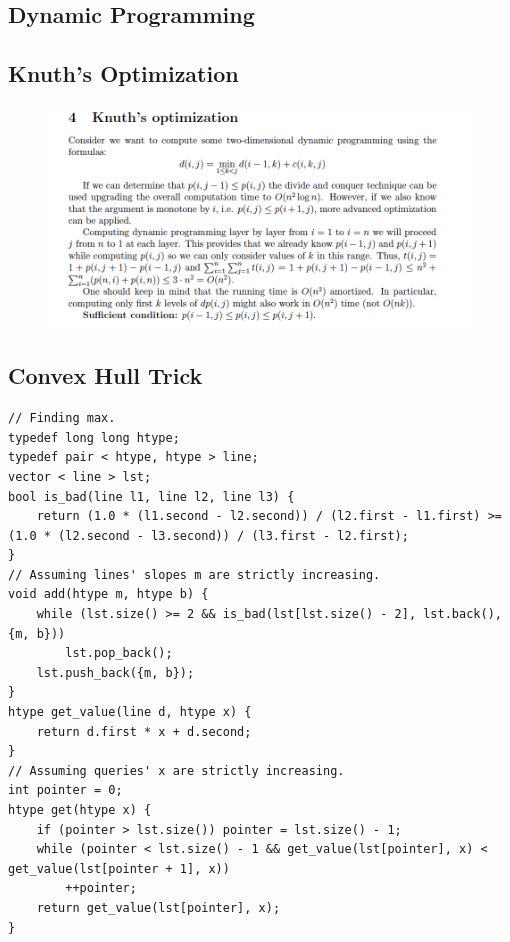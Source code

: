 \documentclass[10pt,letterpaper,landscape]{article}
\begin{document}
\begin{multicols}{2}
\section{Dynamic Programming}
\subsection{Knuth's Optimization}
\begin{figure}[H]
	\includegraphics[scale=0.75]{knuth.png}
\end{figure}
\subsection{Convex Hull Trick}
\begin{lstlisting}
// Finding max.
typedef long long htype;
typedef pair < htype, htype > line;
vector < line > lst;
bool is_bad(line l1, line l2, line l3) {
    return (1.0 * (l1.second - l2.second)) / (l2.first - l1.first) >= (1.0 * (l2.second - l3.second)) / (l3.first - l2.first);
}
// Assuming lines' slopes m are strictly increasing.
void add(htype m, htype b) {
    while (lst.size() >= 2 && is_bad(lst[lst.size() - 2], lst.back(), {m, b}))
        lst.pop_back();
    lst.push_back({m, b});
}
htype get_value(line d, htype x) {
    return d.first * x + d.second;
}
// Assuming queries' x are strictly increasing.
int pointer = 0;
htype get(htype x) {
    if (pointer > lst.size()) pointer = lst.size() - 1;
    while (pointer < lst.size() - 1 && get_value(lst[pointer], x) < get_value(lst[pointer + 1], x))
        ++pointer;
    return get_value(lst[pointer], x);
}
\end{lstlisting}

\end{multicols}
\end{document}
